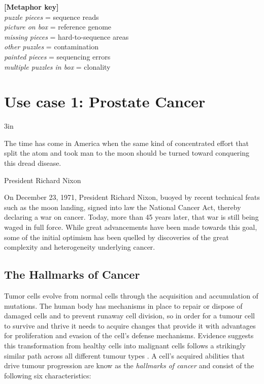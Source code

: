 \begin{justify}
\begin{center}
\begin{minipage}{6in}
\begin{center}
{\vspace*{0.5cm}
\textbf{[Metaphor key]} \\
\textit{puzzle pieces} = sequence reads \\
\textit{picture on box} = reference genome \\
\textit{missing pieces} = hard-to-sequence areas \\
\textit{other puzzles} = contamination \\
\textit{painted pieces} = sequencing errors \\
\textit{multiple puzzles in box} = clonality
}

\end{center}
\end{minipage}
\end{center}



\newpage
\section{Use case 1: Prostate Cancer}

\epigraph{3in}{The time has come in America when the same kind of concentrated effort that split the atom and took man to the moon should be turned toward conquering this dread disease.}{President Richard Nixon}

On December 23, 1971, President Richard Nixon, buoyed by recent technical feats such as the moon landing, signed into law the National Cancer Act, thereby declaring a war on cancer. Today, more than 45 years later, that war is still being waged in full force. While great advancements have been made towards this goal, some of the initial optimism has been quelled by discoveries of the great complexity and heterogeneity underlying cancer.


\subsection{The Hallmarks of Cancer}

Tumor cells evolve from normal cells through the acquisition and accumulation of mutations. The human body has mechanisms in place to repair or dispose of damaged cells and to prevent runaway cell division, so in order for a tumour cell to survive and thrive it needs to acquire changes that provide it with advantages for proliferation and evasion of the cell's defense mechanisms. Evidence suggests this transformation from healthy cells into malignant cells follows a strikingly similar path across all different tumour types \cite{}. A cell's acquired abilities that drive tumour progression are know as the \emph{hallmarks of cancer} and consist of the following six characteristics:


\end{justify}

